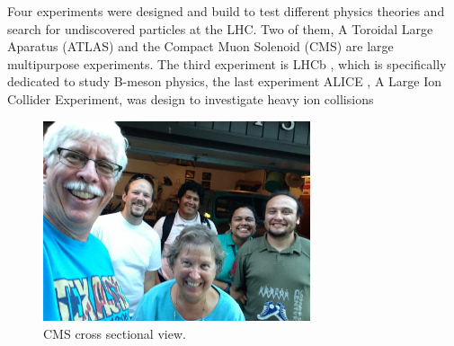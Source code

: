 Four experiments were designed and build to test different physics theories and search for undiscovered particles at the LHC. Two of them, A Toroidal Large Aparatus (ATLAS)\cite{atlas} and the Compact Muon Solenoid (CMS)\cite{cms_doc} are large multipurpose experiments. The third experiment is LHCb \cite{lhcb}, which is specifically dedicated to study B-meson physics, the last experiment ALICE \cite{alice}, A Large Ion Collider Experiment, was design to investigate heavy ion collisions
\begin{figure}[!h]
  \centering
  \includegraphics[width=0.7\textwidth]{../images/ch2/12}
  \caption[CMS cross sectional view]{CMS cross sectional view.}\label{fig:cms_cross}
\end{figure}
